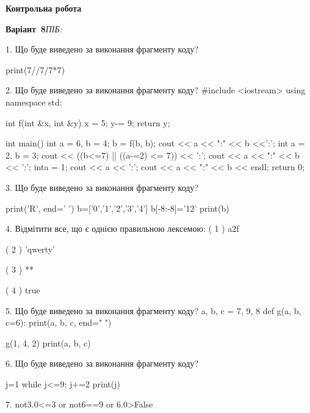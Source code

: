 \documentclass[11pt]{article}
\begin{document}
{\large\textbf{Контрольна робота}}

\textbf{Варіант \No\,8}\hfill \textit{ПІБ:}\,\underline{\hspace{60mm}}
\vspace{4mm}

1. Що буде виведено за виконання фрагменту коду?

print(7//7/7*7)
\vspace{5mm}

2. Що буде виведено за виконання фрагменту коду?
#include <iostream>
using namespace std;

int f(int &x, int &y){
    x = 5;
    y-= 9;
    return y;
}

int main(){
    int a = 6, b = 4;
    b = f(b, b);
    cout << a << ":" << b <<':';
    {
        int a = 2, b = 3;
        cout << ((b<=7) || ((a-=2) <= 7)) << ':';
        cout << a << ":" << b << ':';
    }
    {
        inta = 1;
        cout << a << ':';
    }
    cout << a << ":" << b << endl;
    return 0;
}

\vspace{5mm}

3. Що буде виведено за виконання фрагменту коду?

print('R', end=' ')
b=['0','1','2','3','4']
b[-8:-8]='12'
print(b)

\vspace{5mm}

4. %
Відмітити все, що є однією правильною лексемою:
( 1 ) a2f

( 2 ) 'qwerty'

( 3 ) **

( 4 ) true
\vspace{5mm}

5. Що буде виведено за виконання фрагменту коду?
a, b, c = 7, 9, 8
def g(a, b, c=6):
    print(a, b, c, end=" ")

g(1, 4, 2)
print(a, b, c)
\vspace{5mm}

6. Що буде виведено за виконання фрагменту коду?

j=1
while j<=9:
    j+=2
print(j)

\vspace{5mm}

7. 
not3.0<=3 or not6==9 or 6.0>False\vspace{5mm}
\end{document}
